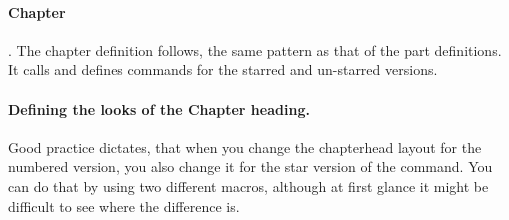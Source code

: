 \begin{teX}
\def\@spart#1{%
    {\centering
     \interlinepenalty \@M
     \normalfont
     \Huge \bfseries #1\par}%
    \@endpart}

\def\@endpart{\vfil\newpage
              \if@twoside
               \if@openright
                \null
                \thispagestyle{empty}%
                \newpage
               \fi
              \fi
              \if@tempswa
                \twocolumn
              \fi}
\end{teX}


\paragraph{Chapter}. The chapter definition follows, the same pattern as that of the part definitions. It calls  and defines commands for the starred and un-starred versions.


\begin{teX}
\newcommand\chapter{\if@openright\cleardoublepage\else\clearpage\fi
                    \thispagestyle{plain}%
                    \global\@topnum\z@
                    \@afterindentfalse
                    \secdef\@chapter\@schapter}
\end{teX}


\begin{teX}
\def\@chapter[#1]#2{
    \ifnum \c@secnumdepth >\m@ne
       \if@mainmatter
             \refstepcounter{chapter}%
             \typeout{\@chapapp\space\thechapter.}%
             \addcontentsline{toc}{chapter}%
             {\protect\numberline{\thechapter}#1}%
       \else
             \addcontentsline{toc}{chapter}{#1}%
      \fi
   \else
         \addcontentsline{toc}{chapter}{#1}%
   \fi
   \chaptermark{#1}%
   \addtocontents{lof}{\protect\addvspace{10\p@}}%
   \addtocontents{lot}{\protect\addvspace{10\p@}}%
   \if@twocolumn
        \@topnewpage[\@makechapterhead{#2}]%
   \else
        \@makechapterhead{#2}%
        \@afterheading
   \fi}
\end{teX}

\begin{multicols}{2}
\paragraph{Defining the looks of the Chapter heading.}
Good practice dictates, that when you change the chapterhead layout for the numbered version, you also change it for the star version of the command. You can do that by using two different macros, although at first glance it might be difficult to see where the difference is.
\end{multicols}


